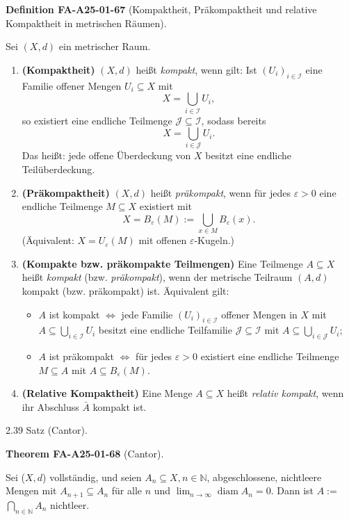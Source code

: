 \documentclass[10pt, letterpaper]{article}
\newcommand{\CustomHeading}[3]{%
  \par\medskip\noindent%
  \textbf{#1 #2} \textnormal{(#3)}.\enskip%
}
\newenvironment{DEF}[2]{\begin{unitbox}\CustomHeading{Definition}{#1}{#2}}{\end{unitbox}}
\newenvironment{THEO}[2]{\begin{unitbox}\CustomHeading{Theorem}{#1}{#2}}{\end{unitbox}}
\begin{document}
\begin{DEF}{FA-A25-01-67}{Kompaktheit, Präkompaktheit und relative Kompaktheit in metrischen Räumen}
Sei $(X,d)$ ein metrischer Raum.

\begin{enumerate}
\item[(a)] \textbf{(Kompaktheit)}  
$(X,d)$ heißt \emph{kompakt}, wenn gilt:  
Ist $(U_i)_{i\in\mathcal{I}}$ eine Familie offener Mengen $U_i\subseteq X$ mit
\[
X = \bigcup_{i\in\mathcal{I}} U_i,
\]
so existiert eine endliche Teilmenge $\mathcal{J}\subseteq\mathcal{I}$, sodass bereits
\[
X = \bigcup_{i\in\mathcal{J}} U_i.
\]
Das heißt: jede offene Überdeckung von $X$ besitzt eine endliche Teilüberdeckung.

\item[(b)] \textbf{(Präkompaktheit)}  
$(X,d)$ heißt \emph{präkompakt}, wenn für jedes $\varepsilon>0$ eine endliche Teilmenge $M\subseteq X$ existiert mit
\[
X = B_{\varepsilon}(M) := \bigcup_{x\in M} B_{\varepsilon}(x).
\]
(Äquivalent: $X=U_{\varepsilon}(M)$ mit offenen $\varepsilon$-Kugeln.)

\item[(c)] \textbf{(Kompakte bzw. präkompakte Teilmengen)}  
Eine Teilmenge $A\subseteq X$ heißt \emph{kompakt} (bzw. \emph{präkompakt}), wenn der metrische Teilraum $(A,d)$ kompakt (bzw. präkompakt) ist.  
Äquivalent gilt:
\begin{itemize}
  \item $A$ ist kompakt $\Longleftrightarrow$  
  jede Familie $(U_i)_{i\in\mathcal{I}}$ offener Mengen in $X$ mit $A\subseteq\bigcup_{i\in\mathcal{I}}U_i$ besitzt eine endliche Teilfamilie $\mathcal{J}\subseteq\mathcal{I}$ mit $A\subseteq\bigcup_{i\in\mathcal{J}}U_i$;
  \item $A$ ist präkompakt $\Longleftrightarrow$  
  für jedes $\varepsilon>0$ existiert eine endliche Teilmenge $M\subseteq A$ mit $A\subseteq B_{\varepsilon}(M)$.
\end{itemize}

\item[(d)] \textbf{(Relative Kompaktheit)}  
Eine Menge $A\subseteq X$ heißt \emph{relativ kompakt}, wenn ihr Abschluss $\bar{A}$ kompakt ist.
\end{enumerate}
\end{DEF}



2.39 Satz (Cantor). 

\begin{THEO}{FA-A25-01-68}{Cantor}
Sei  ($X,d$) vollständig, und seien $A_{n} \subseteq X, n \in \mathbb{N}$, abgeschlossene, nichtleere Mengen mit $A_{n+1} \subseteq A_{n}$ für alle $n$ und $\lim _{n \rightarrow \infty} \operatorname{diam} A_{n}=0$. Dann ist $A:=$ $\bigcap_{n \in \mathbb{N}} A_{n}$ nichtleer.
\end{THEO}
\end{document}
